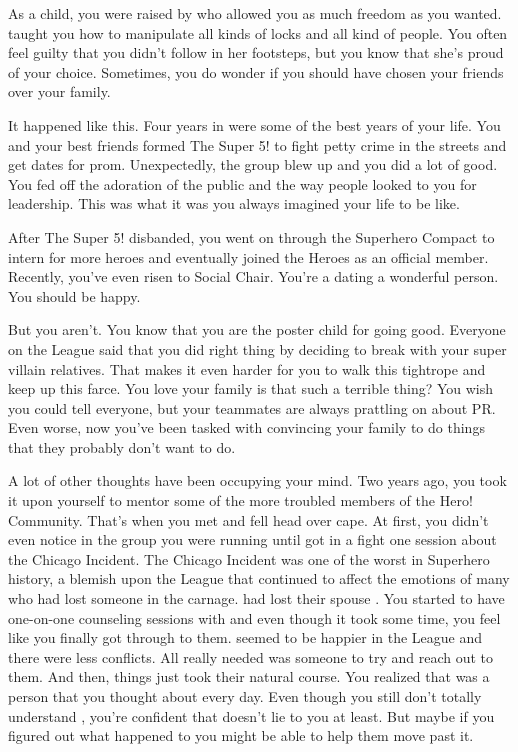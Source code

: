 \documentclass[char]{LRSguildcamp1}
\begin{document}
\name{\cYoungest{}}

As a child, you were raised by \cGrandma{} who allowed you as much freedom as you wanted. \cGrandma{} taught you how to manipulate all kinds of locks and all kind of people. You often feel guilty that you didn't follow in her footsteps, but you know that she's proud of your choice. Sometimes, you do wonder if you should have chosen your friends over your family. 

It happened like this. Four years in \pSuperSchool{} were some of the best years  of your life. You and your best friends formed The Super 5! to fight petty crime in the streets and get dates for prom. Unexpectedly, the group blew up and you did a lot of good. You fed off the adoration of the public and the way people looked to you for leadership. This was what it was you always imagined your life to be like.  
 
After The Super 5! disbanded, you went on through the Superhero Compact to intern for more heroes and eventually joined the Heroes as an official member. Recently, you've even risen to Social Chair. You're a dating a wonderful person. You should be happy. 

But you aren't. You know that you are the poster child for going good.  Everyone on the League said that you did right thing by deciding to break with your super villain relatives. That makes it even harder for you to walk this tightrope and keep up this farce. You love your family is that such a terrible thing? You wish you could tell everyone, but your teammates are always prattling on about PR.  Even worse, now you've been tasked with convincing your family to do things that they probably don't want to do. 

A lot of other thoughts have been occupying your mind. Two years ago, you took it upon yourself to mentor some of the more troubled members of the Hero! Community. That's when you met \cYS{} and fell head over cape. At first, you didn't even notice \cYS{} in the group you were running until \cYS{} got in a fight one session about the Chicago Incident. The Chicago Incident was one of the worst in Superhero history, a blemish upon the League that continued to affect the emotions of many who had lost someone in the carnage. \cArchitect{} had lost their spouse \cAS{}. You started to have one-on-one counseling sessions with \cYS{} and even though it took some time, you feel like you finally got through to them. \cYS{} seemed to be happier in the League and there were less conflicts.  All\cYS{} really needed was someone to try and reach out to them. And then, things just took their natural course. You realized that \cYS{} was a person that you thought about every day. Even though you still don't totally understand  \cYS {\them}, you're confident that \cYS{} doesn't lie to you at least. But maybe if you figured out what happened to \cYS{} you might be able to help them move past it. 
 
\end{document}
